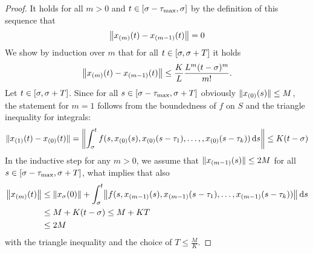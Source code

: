 \begin{proof}
        It holds for all $m>0$ and $t\in \compactum{\tzero-\taumax}{\tzero}$ by the definition of this sequence that
        \begin{equation*}
            \nnorm*{x_{(m)}(t)-x_{(m-1)}(t)}=0
        \end{equation*}
        We show by induction over $m$ that for all $t\in [\tzero,\tzero+T]$ it holds
        \begin{equation*}
            \nnorm*{x_{(m)}(t)-x_{(m-1)}(t)} \leq \frac{K}{L}\frac{L^m (t-\tzero)^m}{m!}.
        \end{equation*}
        Let $t\in [\tzero,\tzero+T]$. Since for all $s\in [\tzero-\taumax,\tzero+T]$ obviously $\nnorm{x_{(0)}(s)}\leq M$, the statement for $m=1$ follows from the boundedness of $f$ on $S$ and the triangle inequality for integrals:
        \begin{equation*}
            \nnorm{x_{(1)}(t)-x_{(0)}(t)} = \nnorm*{\integral{\tzero}{t} f(s,x_{(0)}(s),x_{(0)}(s-\tau_1),\ldots,,x_{(0)}(s-\tau_k))\dx[s]} \leq K(t-\tzero)
        \end{equation*}
        In the inductive step for any $m>0$, we assume that $\nnorm{x_{(m-1)}(s)}\leq 2M$ for all $s\in [\tzero-\taumax,\tzero+T]$, what implies that also
        \begin{align}\label{eq:bounded-xm}
            \nnorm*{x_{(m)}(t)} &\leq \nnorm*{x_\tzero(0)} + \integral{\tzero}{t} \nnorm*{f(s,x_{(m-1)}(s),x_{(m-1)}(s-\tau_1),\ldots,x_{(m-1)}(s-\tau_k))}\dx[s] \nonumber \\
            &\leq M + K(t-\tzero) \leq M+KT \nonumber \\
            &\leq 2M
        \end{align}
        with the triangle inequality and the choice of $T\leq\frac{M}{K}$.


\end{proof}
